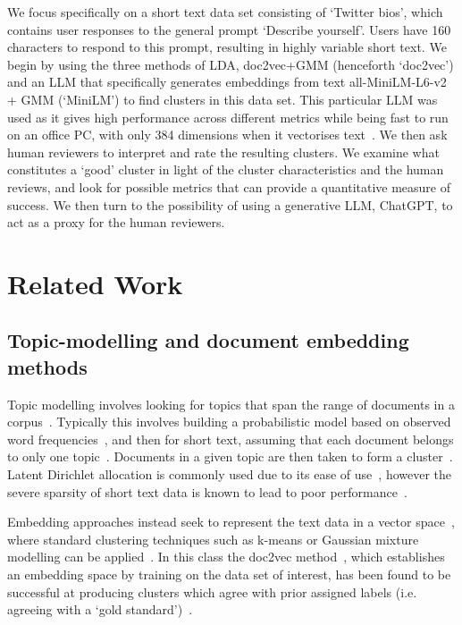 \documentclass{article}
\begin{document}
We focus specifically on a short text data set consisting of `Twitter bios', which contains user responses to the general prompt `Describe yourself'.  Users have 160 characters to respond to this prompt, resulting in highly variable short text.  We begin by using the three methods of LDA, doc2vec+GMM (henceforth `doc2vec') and an LLM that specifically generates embeddings from text all-MiniLM-L6-v2~\cite{wang2020minilm, reimers-2019-sentence-bert} + GMM (`MiniLM') to find clusters in this data set. This particular LLM was used as it gives high performance across different metrics while being fast to run on an office PC, with only 384 dimensions when it vectorises text~\cite{reimers-2019-sentence-bert, MTEBLeaderboardHugging}.  We then ask human reviewers to interpret and rate the resulting clusters.  We examine what constitutes a `good' cluster in light of the cluster characteristics and the human reviews, and look for possible metrics that can provide a quantitative measure of success.  We then turn to the possibility of using a generative LLM, ChatGPT, to act as a proxy for the human reviewers.

\section{Related Work}

\subsection{Topic-modelling and document embedding methods}

Topic modelling involves looking for topics that span the range of documents in a corpus~\cite{qiang2022}.  Typically this involves building a probabilistic model based on observed word frequencies~\cite{blei2003}, and then for short text, assuming that each document belongs to only one topic~\cite{qiang2022}.  Documents in a given topic are then taken to form a cluster~\cite{curiskis2020}. Latent Dirichlet allocation is commonly used due to its ease of use~\cite{jelodar2019}, however the severe sparsity of short text data is known to lead to poor performance~\cite{cheng2014}.

Embedding approaches instead seek to represent the text data in a vector space~\cite{ahmed2022short}, where standard clustering techniques such as k-means or Gaussian mixture modelling can be applied~\cite{rodriguez2019}.  {In this class the doc2vec method~\cite{le2014}, which establishes an embedding space by training on the data set of interest, has been found to be successful at producing clusters which agree with prior assigned labels (i.e. agreeing with a `gold standard')~\cite{curiskis2020}.}
\end{document}
